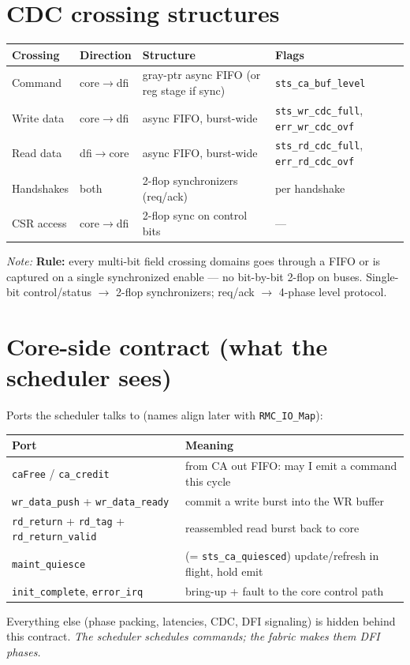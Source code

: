 \documentclass[11pt]{article}
\newcommand{\sig}[1]{\texttt{#1}}
\newcommand{\reg}[1]{\texttt{#1}}
\newcommand{\note}[1]{\par\smallskip\noindent\textit{Note:} #1\par}
\begin{document}
\section{CDC crossing structures}
\begin{center}\begin{tabular}{@{}lL{2.4cm}L{5.4cm}L{3.2cm}@{}}\toprule
Crossing & Direction & Structure & Flags \\ \midrule
Command & core$\to$dfi & gray-ptr async FIFO (or reg stage if sync) & \reg{sts\_ca\_buf\_level} \\
Write data & core$\to$dfi & async FIFO, burst-wide & \reg{sts\_wr\_cdc\_full}, \reg{err\_wr\_cdc\_ovf} \\
Read data & dfi$\to$core & async FIFO, burst-wide & \reg{sts\_rd\_cdc\_full}, \reg{err\_rd\_cdc\_ovf} \\
Handshakes & both & 2-flop synchronizers (req/ack) & per handshake \\
CSR access & core$\to$dfi & 2-flop sync on control bits & --- \\ \bottomrule
\end{tabular}\end{center}
\note{\textbf{Rule:} every multi-bit field crossing domains goes through a FIFO or is
captured on a single synchronized enable --- no bit-by-bit 2-flop on buses. Single-bit
control/status $\to$ 2-flop synchronizers; req/ack $\to$ 4-phase level protocol.}

\section{Core-side contract (what the scheduler sees)}
Ports the scheduler talks to (names align later with \sig{RMC\_IO\_Map}):
\begin{center}\begin{tabular}{@{}lL{9.4cm}@{}}\toprule
Port & Meaning \\ \midrule
\sig{caFree} / \sig{ca\_credit} & from CA out FIFO: may I emit a command this cycle \\
\sig{wr\_data\_push} + \sig{wr\_data\_ready} & commit a write burst into the WR buffer \\
\sig{rd\_return} + \sig{rd\_tag} + \sig{rd\_return\_valid} & reassembled read burst back to core \\
\sig{maint\_quiesce} & (= \reg{sts\_ca\_quiesced}) update/refresh in flight, hold emit \\
\sig{init\_complete}, \sig{error\_irq} & bring-up + fault to the core control path \\ \bottomrule
\end{tabular}\end{center}
Everything else (phase packing, latencies, CDC, DFI signaling) is hidden behind this
contract. \emph{The scheduler schedules commands; the fabric makes them DFI phases.}
\end{document}
